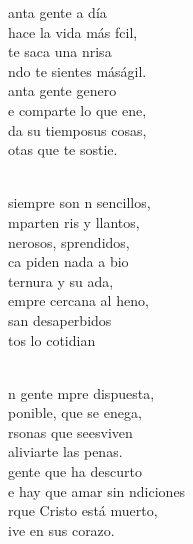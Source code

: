 \documentclass[12pt]{article}
\begin{document}
\begin{multicols*}{2}
\begin{cancion}%
	anta gente a día\\
	hace la vida más fcil,\\
	te saca una nrisa\\
	ndo te sientes máságil.\\
	anta gente genero\\
	e comparte lo que ene,\\
	 da su tiemposus cosas,\\
	otas que te sostie.\\\jump\\
	\begin{chorus}%
	siempre son n sencillos,\\
	mparten ris y llantos,\\
	nerosos, sprendidos,\\
	ca piden nada a bio\\
	 ternura y su ada,\\
	empre cercana al heno,\\
	san desaperbidos\\
	tos lo cotidian\\
	\end{chorus}%
	\jump\\
	n gente mpre dispuesta,\\
	ponible, que se enega,\\
	rsonas que seesviven\\
	 aliviarte las penas.\\
	 gente que ha descurto\\
	e hay que amar sin ndiciones\\
	rque Cristo  está muerto,\\
	ive en sus corazo.\\\jump\\

\end{cancion}
\end{multicols*}
\end{document}
